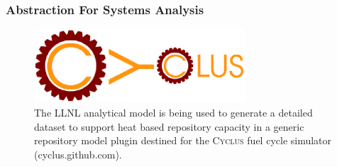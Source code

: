 \begin{frame}[ctb!]
  \frametitle{Abstraction For Systems Analysis}
\begin{figure}[htb!]
  \begin{center}
    \includegraphics[width=0.7\textwidth]{cyclus.ps}
  \end{center}
  \caption{The LLNL analytical model is being used to generate a detailed 
  dataset to support heat based repository capacity in a generic repository 
  model plugin destined for the \textsc{Cyclus} fuel cycle simulator 
  (cyclus.github.com).}
  \label{fig:cyclus}
\end{figure}
\end{frame}
